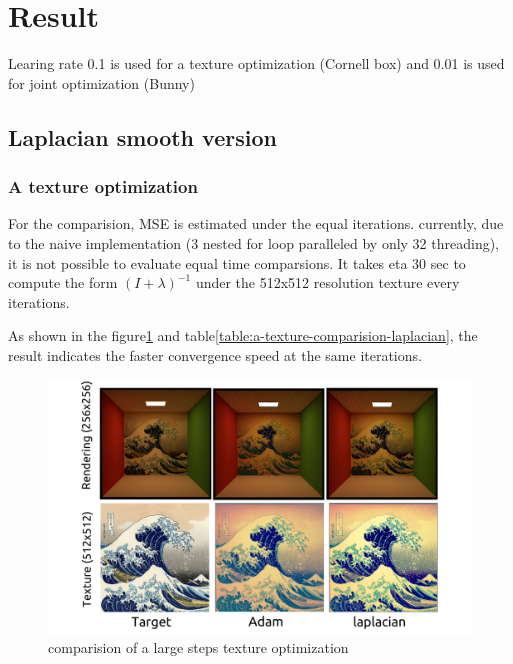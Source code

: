 \section*{Result}\label{ch:ch4label}

Learing rate 0.1 is used for a texture optimization (Cornell box) and 0.01 is used for joint optimization (Bunny)

\subsection*{Laplacian smooth version}

\subsubsection{A texture optimization}

For the comparision, MSE is estimated under the equal iterations.
currently, due to the naive implementation (3 nested for loop paralleled by only 32 threading), it is not possible to evaluate equal time comparsions. It takes eta 30 sec to compute the form $(I+\lambda)^{-1}$ under the 512x512 resolution texture every iterations. 

As shown in the figure\ref{fig:a-texture-comparision-laplacian} and table\ref{table:a-texture-comparision-laplacian}, the result indicates the faster convergence speed at the same iterations.

\begin{figure}[!h]
    \includegraphics[width=\textwidth]{figures/result-1.png}
    \caption{comparision of a large steps texture optimization}
    \label{fig:a-texture-comparision-laplacian}
\end{figure}

